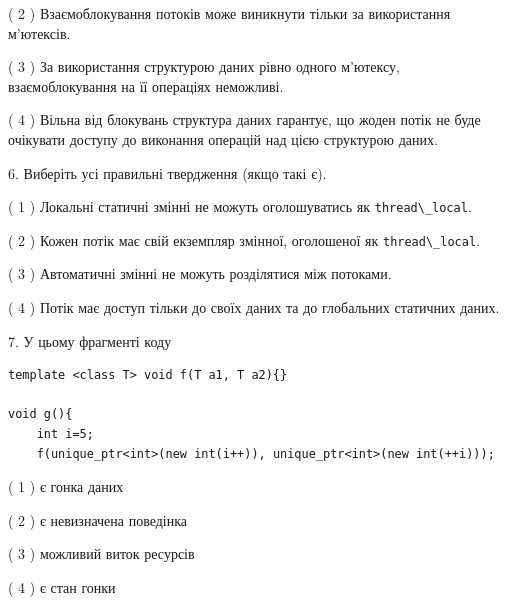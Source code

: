 \documentclass[12pt, ukrainian]{article}
\def\code#1{\Verb!#1!}
\begin{document}
\begin {large}
{( 2 ) Взаємоблокування потоків може виникнути тільки за використання м’ютексів.%

( 3 ) За використання структурою даних рівно одного м’ютексу, взаємоблокування на її операціях неможливі.%

( 4 ) Вільна від блокувань структура даних гарантує, що жоден потік не буде очікувати доступу до виконання операцій над цією структурою даних.%
\newpage



\vspace{5mm}
6. Виберіть усі правильні твердження (якщо такі є).\par
\vspace{2mm}

( 1 ) Локальні статичні змінні не можуть оголошуватись як \code{thread\_local}.%

( 2 ) Кожен потік має свій екземпляр змінної, оголошеної як \code{thread\_local}.%

( 3 ) Автоматичні змінні не можуть розділятися між потоками.%

( 4 ) Потік має доступ тільки до своїх даних та до глобальних статичних даних.%


\vspace{5mm}
7. У цьому фрагменті коду
\begin{verbatim}
template <class T> void f(T a1, T a2){}

void g(){
    int i=5;
    f(unique_ptr<int>(new int(i++)), unique_ptr<int>(new int(++i)));
\end{verbatim}

( 1 ) є гонка даних%

( 2 ) є невизначена поведінка%

( 3 ) можливий виток ресурсів%

( 4 ) є стан гонки%
}
\end {large}
\end{document}
